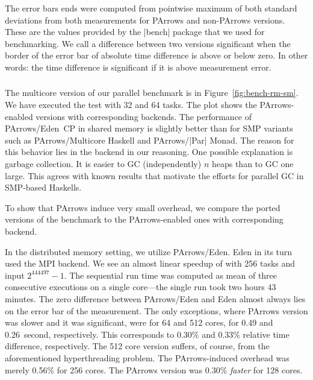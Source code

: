 The error bars ends were computed from pointwise maximum of both standard
deviations from both measurements for PArrows and non-PArrows
versions. These are the values provided by the |bench| package that we
used for benchmarking. We call a difference between two versions
significant when the border of the error bar of absolute time
difference is above or below zero. In other words: the time
difference is significant if it is above measurement error.

\subsubsection{\rmtest}
The multicore version of our parallel \rmtest benchmark is in
Figure~\ref{fig:bench-rm-sm}. We have executed the test with 32 and 64
tasks. The plot shows the PArrows-enabled versions with corresponding backends.
The performance of PArrows/Eden~CP in shared memory is slightly better than
for SMP variants such as PArrows/Multicore Haskell and PArrows/|Par|
Monad. The reason for this behavior lies in the backend in our reasoning. One
possible explanation is garbage collection. It is easier to GC
(independently) $n$ heaps than to GC one large. This agrees with known
results that motivate the efforts for
parallel GC in SMP-based Haskells.

To show that PArrows induce very small overhead, we compare the ported
versions of the benchmark to the PArrows-enabled ones with
corresponding backend.

In the distributed memory setting, we utilize PArrows/Eden. Eden in
its turn used the MPI backend. We see an almost linear speedup of
\rmtest with 256 tasks and input $2^444497-1$. The sequential run time
was computed as mean of three consecutive executions on a single
core---the single run took two hours 43 minutes. The zero difference  between
PArrows/Eden and Eden almost always lies on the error bar of
the measurement. The only exceptions, where PArrows version was slower
and it was significant, were for 64 and
512 cores, for 0.49 and 0.26~second, respectively. This corresponds to
0.30\% and 0.33\% relative time difference, respectively. The 512 core
version suffers, of course, from the aforementioned hyperthreading
problem. The PArrows-induced overhead was merely 0.56\% for 256
cores. The PArrows version was 0.30\% \emph{faster} for 128 cores.
